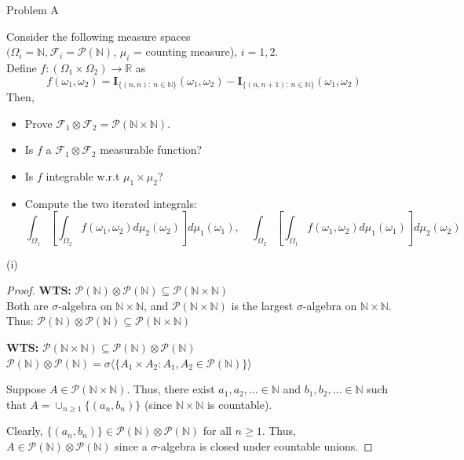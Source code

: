 \documentclass[12pt,letterpaper, onecolumn]{exam}
\newcommand{\real}{\mathbb{R}}
\newcommand{\nat}{\mathbb{N}}
\newcommand{\power}{\mathcal{P}}
\newcommand{\salg}{$\sigma$-algebra }
\newcommand{\calF}{\mathcal{F}}
\newcommand{\I}{\mathbf{I}}
\newcommand{\gensig}[1]{\sigma\langle #1 \rangle} %
\begin{document}
\begin{questions}
    \clearpage

    \question Problem A

    Consider the following measure spaces \\
    $(\Omega_i = \nat, \calF_i = \power(\nat)$, $\mu_i$ = counting measure), $i = 1, 2$. \\
    Define $f : (\Omega_1 \times \Omega_2) \rightarrow \real$ as
    \[f(\omega_1, \omega_2) = \I_{\{(n, n): \: n\in \nat\}}(\omega_1, \omega_2) - \I_{\{(n, n + 1) : \: n\in \nat\}}(\omega_1, \omega_2)\]
    Then,
    \begin{itemize}
    \item[(i)] Prove $\calF_1 \otimes \calF_2 = \power (\nat \times \nat)$.
    \item[(ii)] Is $f$ a $\calF_1 \otimes \calF_2$ measurable function?
    \item[(iii)] Is $f$ integrable w.r.t $\mu_1 \times \mu_2$?
    \item[(iv)] Compute the two iterated integrals:
    \[\int_{\Omega_1} \left[\int_{\Omega_2} f(\omega_1, \omega_2) d \mu_2(\omega_2)\right]d\mu_1(\omega_1), \quad \int_{\Omega_2}\left[\int_{\Omega_1} f(\omega_1, \omega_2) d\mu_1(\omega_1)\right]d\mu_2(\omega_2)\]
    
    \end{itemize}

    \begin{solution}
    (i) \begin{proof}
        \textbf{WTS:} $\power(\nat) \otimes \power(\nat) \subseteq \power(\nat \times \nat) $ \\
       Both are \salg on $\nat \times \nat$, and $\power(\nat \times \nat)$ is the largest \salg on $\nat \times \nat$. Thus: $\power(\nat) \otimes \power(\nat) \subseteq \power(\nat \times \nat) $ 
       
        \textbf{WTS:} $\power(\nat \times \nat) \subseteq \power(\nat) \otimes \power(\nat)$ \\
        $\power(\nat) \otimes \power(\nat) = \gensig{\{ A_1 \times A_2: A_1, A_2 \in \power(\nat)\}}$

        Suppose $A \in \power(\nat \times \nat)$. Thus, there exist $a_1, a_2, ... \in \nat$ and $b_1, b_2, ... \in \nat$ such that $A = \cup_{n \geq 1} \{(a_n, b_n)\}$ (since $\nat \times \nat$ is countable). 

        Clearly, $\{(a_n, b_n)\} \in \power(\nat) \otimes \power(\nat)$ for all $n \geq 1$. Thus, $A \in \power(\nat) \otimes \power(\nat)$ since a \salg is closed under countable unions.


\end{proof}
\end{solution}
\end{questions}
\end{document}
